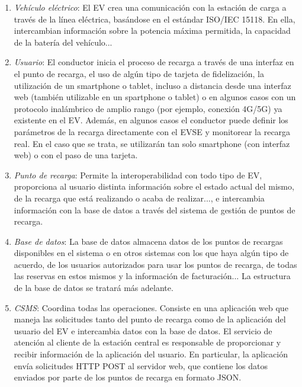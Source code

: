 \documentclass[12pt,a4paper,onecolumn,oneside]{report}
\begin{document}
\begin{enumerate}

\item \textit{Vehículo eléctrico}: El EV crea una comunicación con la estación de carga a través de la línea eléctrica, basándose en el estándar ISO/IEC 15118. En ella, intercambian información sobre la potencia máxima permitida, la capacidad de la batería del vehículo...

\item \textit{Usuario}: El conductor inicia el proceso de recarga a través de una interfaz en el punto de recarga, el uso de algún tipo de tarjeta de fidelización, la utilización de un smartphone o tablet, incluso a distancia desde una interfaz web (también utilizable en un spartphone o tablet) o en algunos casos con un protocolo inalámbrico de amplio rango (por ejemplo, conexión 4G/5G) ya existente en el EV. Además, en algunos casos el conductor puede definir los parámetros de la recarga directamente con el EVSE y monitorear la recarga real. En el caso que se trata, se utilizarán tan solo smartphone (con interfaz web) o con el paso de una tarjeta.

\item \textit{Punto de recarga}: Permite la interoperabilidad con todo tipo de EV, proporciona al usuario distinta información sobre el estado actual del mismo, de la recarga que está realizando o acaba de realizar..., e intercambia información con la base de datos a través del sistema de gestión de puntos de recarga.

\item \textit{Base de datos}: La base de datos almacena datos de los puntos de recargas disponibles en el sistema o en otros sistemas con los que haya algún tipo de acuerdo, de los usuarios autorizados para usar los puntos de recarga, de todas las reservas en estos mismos y la información de facturación... La estructura de la base de datos se tratará más adelante.

\item \textit{CSMS}: Coordina todas las operaciones. Consiste en una aplicación web que maneja las solicitudes tanto del punto de recarga como de la aplicación del usuario del EV e intercambia datos con la base de datos.  El servicio de atención al cliente de la estación central es responsable de proporcionar y recibir información de la aplicación del usuario. En particular, la aplicación envía solicitudes HTTP POST al servidor web, que contiene los datos enviados por parte de los puntos de recarga en formato JSON.

\end{enumerate}
\end{document}

